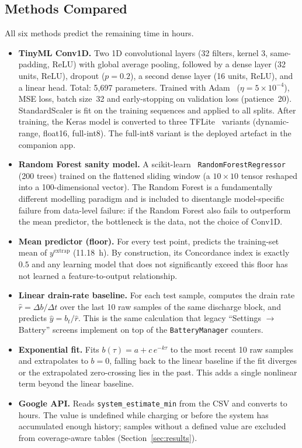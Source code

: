 \documentclass[conference]{IEEEtran}
\begin{document}
\subsection{Methods Compared}
\label{sec:methods}
All six methods predict the remaining time in hours.
\begin{itemize}
\item \textbf{TinyML Conv1D.} Two 1D convolutional layers
(32 filters, kernel 3, same-padding, ReLU) with global average
pooling, followed by a dense layer (32 units, ReLU), dropout
($p{=}0.2$), a second dense layer (16 units, ReLU), and a linear
head. Total: 5{,}697 parameters. Trained with Adam~\cite{kingma2015adam}
($\eta{=}5\!\times\!10^{-4}$), MSE loss, batch size~32 and
early-stopping on validation loss (patience~20). StandardScaler is
fit on the training sequences and applied to all splits. After training, the Keras model is
converted to three TFLite~\cite{abadi2016tensorflow} variants (dynamic-range, float16, full-int8).
The full-int8 variant is the deployed artefact in the
companion app.

\item \textbf{Random Forest sanity model.} A scikit-learn~\cite{pedregosa2011scikit}
\texttt{RandomForestRegressor}~\cite{breiman2001random} (200 trees) trained
on the flattened sliding window (a $10\times10$ tensor reshaped into a
100-dimensional vector). The Random Forest is a fundamentally different
modelling paradigm and is included to disentangle model-specific failure
from data-level failure: if the Random Forest also fails to outperform
the mean predictor, the bottleneck is the data, not the choice of Conv1D.

\item \textbf{Mean predictor (floor).} For every test point, predicts the
training-set mean of $y^{\text{extrap}}$ (\SI{11.18}{\hour}). By
construction, its Concordance index is exactly $0.5$ and any learning
model that does not significantly exceed this floor has not learned a
feature-to-output relationship.

\item \textbf{Linear drain-rate baseline.} For each test sample, computes
the drain rate $\hat{r}{=}\Delta b/\Delta t$ over the last 10 raw samples
of the same discharge block, and predicts $\hat{y}{=}b_t / \hat{r}$. This
is the same calculation that legacy ``Settings $\rightarrow$ Battery''
screens implement on top of the \texttt{BatteryManager} counters.

\item \textbf{Exponential fit.} Fits
$b(\tau){=}a{+}c\,e^{-k\tau}$ to the most recent 10 raw samples and
extrapolates to $b{=}0$, falling back to the linear baseline if the fit
diverges or the extrapolated zero-crossing lies in the past. This adds a
single nonlinear term beyond the linear baseline.

\item \textbf{Google API.} Reads
\texttt{system\_estimate\_min} from the CSV and converts to hours.
The value is undefined while charging or before the system has
accumulated enough history; samples without a defined value are
excluded from coverage-aware tables (Section~\ref{sec:results}).
\end{itemize}
\end{document}
